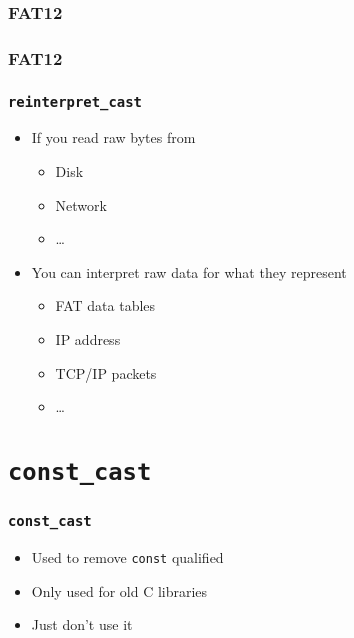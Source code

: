 \begin{frame}
  \frametitle{FAT12}
\end{frame}

\begin{frame}
  \frametitle{FAT12}
\end{frame}

\begin{frame}
  \frametitle{{\tt reinterpret\_cast}}
   \begin{itemize}
    \item If you read raw bytes from
          \begin{itemize}
            \item Disk
            \item Network
            \item \dots
          \end{itemize}
    \item You can interpret raw data for what they represent
          \begin{itemize}
            \item FAT data tables
            \item IP address
            \item TCP/IP packets
            \item \dots
          \end{itemize}
  \end{itemize}
\end{frame}

\section{{\tt const\_cast}}

\frame{\tableofcontents[currentsection]}

\begin{frame}
  \frametitle{{\tt const\_cast}}
  \begin{itemize}
    \item Used to remove {\tt const} qualified
    \item Only used for old C libraries
    \item Just don't use it
  \end{itemize}
\end{frame}




